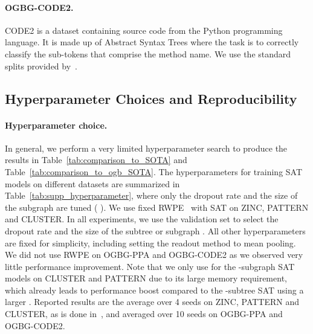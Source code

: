 \paragraph{OGBG-CODE2.} CODE2 \cite{hu2020open} is a dataset containing source code from the Python programming language. It is made up of Abstract Syntax Trees where the task is to correctly classify the sub-tokens that comprise the method name. We use the standard splits provided by~\citet{hu2020open}.

\subsection{Hyperparameter Choices and Reproducibility}\label{sec:supp_hyperparameter}
\paragraph{Hyperparameter choice.}
In general, we perform a very limited hyperparameter search to produce the results in Table~\ref{tab:comparison_to_SOTA} and Table~\ref{tab:comparison_to_ogb_SOTA}. The hyperparameters for training SAT models on different datasets are summarized in Table~\ref{tab:supp_hyperparameter}, where only the dropout rate and the size of the subgraph  are tuned ( ). We use fixed RWPE~\citep{dwivedi2022graph} with SAT on ZINC, PATTERN and CLUSTER. In all experiments, we use the validation set to select the dropout rate and the size of the subtree or subgraph  . All other hyperparameters are fixed for simplicity, including setting the readout method to mean pooling. We did not use RWPE on OGBG-PPA and OGBG-CODE2 as we observed very little performance improvement. Note that we only use  for the -subgraph SAT models on CLUSTER and PATTERN due to its large memory requirement, which already leads to performance boost compared to the -subtree SAT using a larger . Reported results are the average over 4 seeds on ZINC, PATTERN and CLUSTER, as is done in~\citet{dwivedi2020benchmarkgnns}, and averaged over 10 seeds on OGBG-PPA and OGBG-CODE2.

